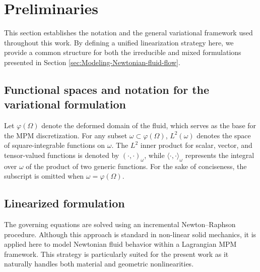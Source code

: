 \documentclass[11pt,english]{article}
\def\InitialDomain{\Omega}
\def\DeformedDomain{\varphi(\InitialDomain)}
\begin{document}
\section{Preliminaries\label{sec:Preliminaries}}

    This section establishes the notation and the general variational framework used throughout this work. By defining a unified linearization strategy here, we provide a common structure for both the irreducible and mixed formulations presented in Section \ref{sec:Modeling-Newtonian-fluid-flow}.

\subsection{Functional spaces and notation for the variational formulation}
    Let $\DeformedDomain$ denote the deformed domain of the fluid, which serves as the base for the MPM discretization. For any subset $\omega \subset \DeformedDomain$, $L^{2}(\omega)$ denotes the space of square-integrable functions on $\omega$. The $L^{2}$ inner product for scalar, vector, and tensor-valued functions is denoted by $(\cdot,\cdot)_{\omega}$, while $\langle\cdot,\cdot\rangle_{\omega}$ represents the integral over $\omega$ of the product of two generic functions. For the sake of conciseness, the subscript is omitted when $\omega = \DeformedDomain$.

\subsection{Linearized formulation \label{subsec:linearized_formulation_general}} 
    The governing equations are solved using an incremental Newton--Raphson procedure. Although this approach is standard in non-linear solid mechanics, it is applied here to model Newtonian fluid behavior within a Lagrangian MPM framework. This strategy is particularly suited for the present work as it naturally handles both material and geometric nonlinearities.
    
\end{document}

